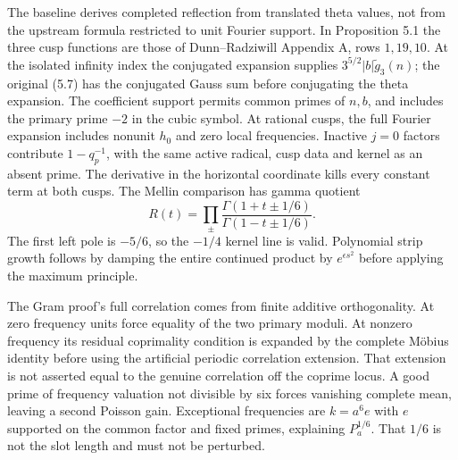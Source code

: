 \documentclass[12pt]{article}
\begin{document}
The baseline derives completed reflection from translated theta
values, not from the upstream formula restricted to unit Fourier
support.  In Proposition 5.1 the three cusp functions are those of
Dunn--Radziwill Appendix A, rows \(1,19,10\).
At the isolated infinity index the conjugated expansion supplies
\(3^{5/2}|b|\widetilde g_3(n)\); the original (5.7) has the conjugated
Gauss sum before conjugating the theta expansion.  The coefficient
support permits common primes of \(n,b\), and includes the primary
prime \(-2\) in the cubic symbol.  At rational cusps, the full
Fourier expansion includes nonunit \(h_0\) and zero local frequencies.
Inactive \(j=0\) factors contribute \(1-q_p^{-1}\), with the same
active radical, cusp data and kernel as an absent prime.
The derivative in the horizontal coordinate kills every constant
term at both cusps.  The Mellin comparison has gamma quotient
\[
 R(t)=\prod_\pm\frac{\Gamma(1+t\pm1/6)}
                         {\Gamma(1-t\pm1/6)}.
\]
The first left pole is \(-5/6\), so the \(-1/4\) kernel line is valid.
Polynomial strip growth follows by damping the entire continued
product by \(e^{\epsilon s^2}\) before applying the maximum principle.

The Gram proof's full correlation comes from finite additive
orthogonality.  At zero frequency units force equality of the two
primary moduli.  At nonzero frequency its residual coprimality
condition is expanded by the complete M\"obius identity before
using the artificial periodic correlation extension.  That extension
is not asserted equal to the genuine correlation off the coprime
locus.  A good prime of frequency valuation not divisible by six
forces vanishing complete mean, leaving a second Poisson gain.
Exceptional frequencies are \(k=a^6e\) with \(e\) supported on
the common factor and fixed primes, explaining \(P_a^{1/6}\).
That \(1/6\) is not the slot length and must not be perturbed.
\end{document}
